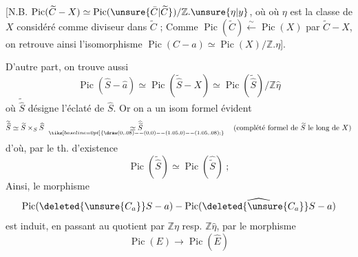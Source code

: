 [N.B. $\operatorname{Pic}(\widetilde C-X)\simeq\operatorname{Pic}(\unsure{\bar C|\widetilde C})/\mathbb Z.\unsure{\eta|y}$, où où $\eta$ est la classe de $X$ considéré comme diviseur dans $\widetilde C$ ;  Comme $\operatorname{Pic}(\widetilde C)\xleftarrow{\sim}\operatorname{Pic}(X)$ par $\widetilde C\mathbin{-}X$, on retrouve ainsi l'isomorphisme $\operatorname{Pic}(C-a)\simeq\operatorname{Pic}(X)/\mathbb Z.\eta$].

D'autre part, on trouve aussi
\[
\operatorname{Pic}(\widehat S-\hat a)\simeq\operatorname{Pic}(\widetilde{\widehat S}-X)\simeq\operatorname{Pic}(\widetilde{\widehat S})/\mathbb Z\hat\eta
\]
où $\widetilde{\widehat S}$ désigne l'éclaté de $\widehat S$. Or on a un isom formel évident
\[
\widetilde{\widehat S}\simeq\widetilde S\times_S\widehat S\ \underset{\smash{\tikz[baseline=0pt]{\draw (0,.08)--(0,0)--(1.05,0)--(1.05,.08);}}}{\simeq\widehat{\widetilde S}}
\quad\text{(complété formel de $\widetilde S$ le long de $X$)}
\]
d'où, par le th. d'existence
\[
\operatorname{Pic}(\widetilde{\widehat S})\simeq\operatorname{Pic}(\widehat{\widetilde S})\ ;
\]
 Ainsi, le  morphisme
\[
\operatorname{Pic}(\deleted{\unsure{C_a}}S-a)\mathbin{-}\operatorname{Pic}(\widehat{\deleted{\unsure{C_a}}S}-a)
\]
est induit, en passant au quotient par $\mathbb Z\eta$ resp. $\mathbb Z\hat\eta$, par le morphisme
\[
\operatorname{Pic}(E)\longrightarrow\operatorname{Pic}(\widehat E)
\]
